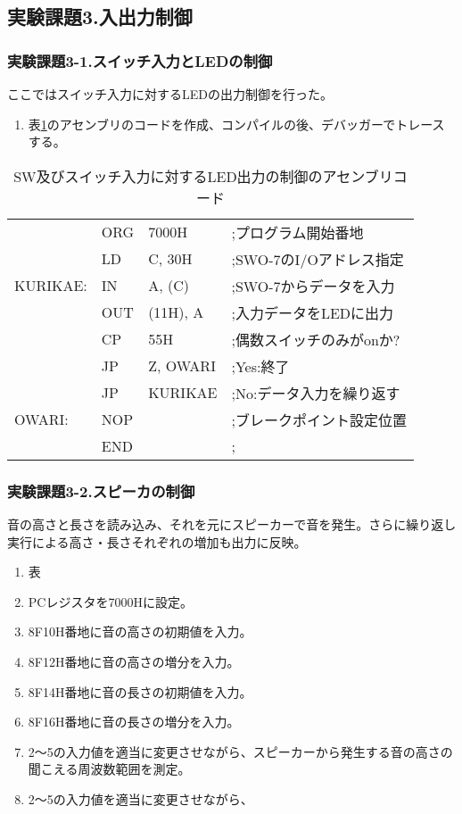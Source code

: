 \documentclass[11pt,a4j]{jsarticle}
\begin{document}
  \subsection{実験課題3.入出力制御}
  
   \subsubsection{実験課題3-1.スイッチ入力とLEDの制御}
   ここではスイッチ入力に対するLEDの出力制御を行った。
   \begin{enumerate}
   \item 表\ref{tab:junbi3-1}のアセンブリのコードを作成、コンパイルの後、デバッガーでトレースする。
   \end{enumerate}
   
   \begin{table}[htb]
  \begin{center}
    \caption{SW及びスイッチ入力に対するLED出力の制御のアセンブリコード}
    \begin{tabular}{|llll|} \hline
 & ORG & 7000H & ;プログラム開始番地 \\
 & LD & C, 30H & ;SWO-7のI/Oアドレス指定 \\
KURIKAE: & IN & A, (C) & ;SWO-7からデータを入力 \\
 & OUT & (11H), A & ;入力データをLEDに出力 \\
 & CP & 55H & ;偶数スイッチのみがonか? \\
 & JP & Z, OWARI & ;Yes:終了 \\
 & JP & KURIKAE & ;No:データ入力を繰り返す \\
OWARI: & NOP &  & ;ブレークポイント設定位置 \\
 & END &  & ; \\ \hline
    \end{tabular}
    \label{tab:junbi3-1}
  \end{center}
 \end{table}
   
   \subsubsection{実験課題3-2.スピーカの制御}
   音の高さと長さを読み込み、それを元にスピーカーで音を発生。さらに繰り返し実行による高さ・長さそれぞれの増加も出力に反映。
   \begin{enumerate}
   \item 表
   \item PCレジスタを7000Hに設定。
   \item 8F10H番地に音の高さの初期値を入力。
   \item 8F12H番地に音の高さの増分を入力。
   \item 8F14H番地に音の長さの初期値を入力。
   \item 8F16H番地に音の長さの増分を入力。
   \item 2～5の入力値を適当に変更させながら、スピーカーから発生する音の高さの聞こえる周波数範囲を測定。
   \item 2～5の入力値を適当に変更させながら、
   \end{enumerate}
   
\end{document}
